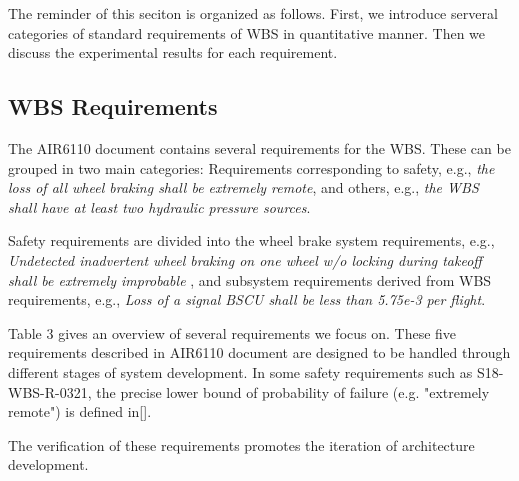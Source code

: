 The reminder of this seciton is organized as follows. First, we introduce serveral categories of standard requirements of WBS in quantitative manner. Then we discuss the experimental results for each requirement.

\subsection{WBS Requirements}
The AIR6110 document contains several requirements for the WBS. These can be grouped in two main categories: Requirements corresponding to safety, e.g., \emph{the loss of all wheel braking shall be extremely remote}, and others, e.g., \emph{the WBS shall have at least two hydraulic pressure sources}.

Safety requirements are divided into the wheel brake system requirements, e.g., \emph{Undetected inadvertent wheel braking on one wheel w/o locking during takeoff shall be extremely improbable
}, and subsystem requirements derived from WBS requirements, e.g., \emph{Loss of a signal BSCU shall be less than 5.75e-3 per flight}.

Table 3 gives an overview of several requirements we focus on. These five requirements described in AIR6110 document are designed to be handled through different stages of system development. In some safety requirements such as S18-WBS-R-0321, the precise lower bound of probability of failure (e.g. "extremely remote") is defined in[].

The verification of these requirements promotes the iteration of architecture development.

